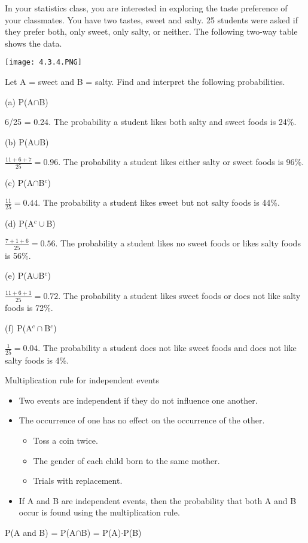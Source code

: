 \documentclass[../stats.tex]{subfiles}
\begin{document}
\begin{example}
    In your statistics class, you are interested in exploring the taste preference of your classmates. You have two tastes, sweet and salty. 25 students were asked if they prefer both, only sweet, only salty, or neither. The following two-way table shows the data.
    \begin{center}
        \texttt{[image: 4.3.4.PNG]}
    \end{center}

    Let A = sweet and B = salty. Find and interpret the following probabilities.

    (a) P(A$\cap$B)

    6/25 = 0.24. The probability a student likes both salty and sweet foods is 24\%.

    (b) P(A$\cup$B)

    $\frac{11+6+7}{25}=0.96$. The probability a student likes either salty or sweet foods is 96\%.

    (c) P(A$\cap$B$^c$)

    $\frac{11}{25}=0.44$. The probability a student likes sweet but not salty foods is 44\%.

    (d) P(A$^c\cup$B)

    $\frac{7+1+6}{25}=0.56$. The probability a student likes no sweet foods or likes salty foods is 56\%.

    (e) P(A$\cup$B$^c$)

    $\frac{11+6+1}{25}=0.72$. The probability a student likes sweet foods or does not like salty foods is 72\%.

    (f) P(A$^c\cap$B$^c$)

    $\frac{1}{25}=0.04$. The probability a student does not like sweet foods and does not like salty foods is 4\%.
\end{example}

Multiplication rule for independent events
\begin{itemize}
    \item Two events are independent if they do not influence one another.
    \item The occurrence of one has no effect on the occurrence of the other.
    \begin{itemize}
        \item Toss a coin twice.
        \item The gender of each child born to the same mother.
        \item Trials with replacement.
    \end{itemize}
    \item If A and B are independent events, then the probability that both A and B occur is found using the multiplication rule.
\end{itemize}
\begin{center}
    P(A and B) = P(A$\cap$B) = P(A)$\cdot$P(B)
\end{center}
\end{document}
